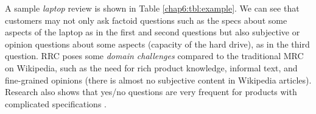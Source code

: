 \label{sec:intro}
\begin{table}[H]
    \centering
    \caption{Review reading comprehension}
    \label{chap6:tbl:example}
\end{table}

A sample \emph{laptop} review is shown in Table \ref{chap6:tbl:example}. 
We can see that customers may not only ask factoid questions such as the specs about some aspects of the laptop as in the first and second questions but also subjective or opinion questions about some aspects (capacity of the hard drive), as in the third question.
RRC poses some \textit{domain challenges} compared to the traditional MRC on Wikipedia, such as the need for rich product knowledge, informal text, and fine-grained opinions (there is almost no subjective content in Wikipedia articles). Research also shows that yes/no questions are very frequent for products with complicated specifications \cite{mcauley2016addressing,Xu2018pro}.

